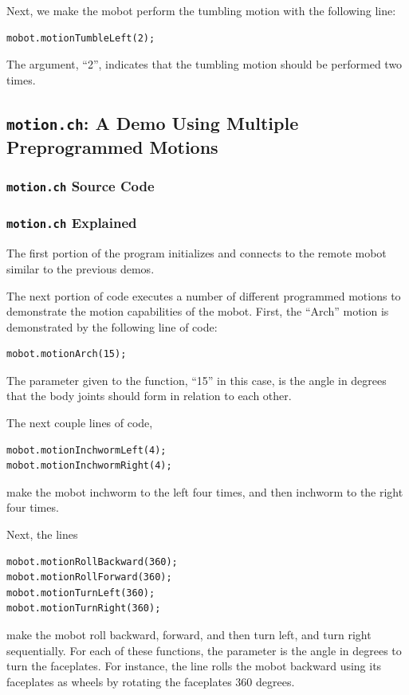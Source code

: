 \documentclass{article}
\begin{document}
Next, we make the mobot perform the tumbling motion with the following line:
\begin{verbatim}
mobot.motionTumbleLeft(2);
\end{verbatim}
The argument, ``2'', indicates that the tumbling motion should be performed
two times.

\subsection{\texttt{motion.ch}: A Demo Using Multiple Preprogrammed Motions}
\subsubsection{\texttt{motion.ch} Source Code}

\subsubsection{\texttt{motion.ch} Explained}
The first portion of the program initializes and connects to the
remote mobot similar to the previous demos.

The next portion of code executes a number of different programmed motions
to demonstrate the motion capabilities of the mobot. First, the ``Arch'' motion
is demonstrated by the following line of code:
\begin{verbatim}
mobot.motionArch(15);
\end{verbatim}
The parameter given to the function, ``15'' in this case, is the angle in degrees 
that the body joints should form in relation to each other. 

The next couple lines of code,
\begin{verbatim}
mobot.motionInchwormLeft(4);
mobot.motionInchwormRight(4);
\end{verbatim}
make the mobot inchworm to the left four times, and then inchworm to the right
four times. 

Next, the lines
\begin{verbatim}
mobot.motionRollBackward(360);
mobot.motionRollForward(360);
mobot.motionTurnLeft(360);
mobot.motionTurnRight(360);
\end{verbatim}
make the mobot roll backward, forward, and then turn left, and turn right
sequentially. For each of these functions, the parameter is the angle in degrees
to turn the faceplates. For instance, the line rolls the mobot backward
using its faceplates as wheels by rotating the faceplates 360 degrees.
\end{document}
